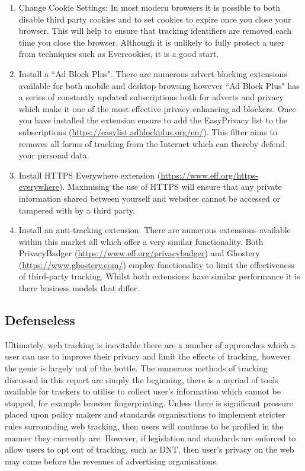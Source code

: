 \documentclass[12pt]{article}
\begin{document}
\begin{enumerate}
    \item Change Cookie Settings: In most modern browsers it is possible to both disable third party cookies and to set cookies to expire once you close your browser. This will help to ensure that tracking identifiers are removed each time you close the browser. Although it is unlikely to fully protect a user from techniques such as Evercookies, it is a good start. 
    \item Install a ``Ad Block Plus". There are numerous advert blocking extensions available for both mobile and desktop browsing however ``Ad Block Plus" has a series of constantly updated subscriptions both for adverts and privacy which make it one of the most effective privacy enhancing ad blockers. Once you have installed the extension ensure to add the EasyPrivacy list to the subscriptions (\url{https://easylist.adblockplus.org/en/}). This filter aims to removes all forms of tracking from the Internet which can thereby defend your personal data.
    \item Install HTTPS Everywhere extension (\url{https://www.eff.org/https-everywhere}). Maximising the use of HTTPS will ensure that any private information shared between yourself and websites cannot be accessed or tampered with by a third party. 
    \item Install an anti-tracking extension. There are numerous extensions available within this market all which offer a very similar functionality. Both PrivacyBadger (\url{https://www.eff.org/privacybadger}) and Ghostery (\url{https://www.ghostery.com/}) employ functionality to limit the effectiveness of third-party tracking. Whilst both extensions have similar performance it is there business models that differ. 
\end{enumerate}

\subsection{Defenseless}
Ultimately, web tracking is inevitable there are a number of approaches which a user can use to improve their privacy and limit the effects of tracking, however the genie is largely out of the bottle. The numerous methods of tracking discussed in this report are simply the beginning, there is a myriad of tools available for trackers to utilise to collect user's information which cannot be stopped, for example browser fingerprinting. Unless there is significant pressure placed upon policy makers and standards organisations to implement stricter rules surrounding web tracking, then users will continue to be profiled in the manner they currently are. However, if legislation and standards are enforced to allow users to opt out of tracking, such as DNT, then user's privacy on the web may come before the revenues of advertising organisations.    
\end{document}

